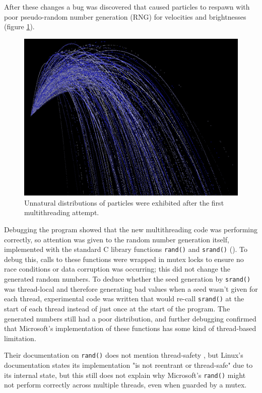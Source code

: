 \documentclass[11pt, a4paper, twocolumn]{article}
\begin{document}
After these changes a bug was discovered that caused particles to respawn with poor pseudo-random number generation (RNG) for velocities and brightnesses (figure \ref{fig:randombug}).

\begin{figure}[h]
\includegraphics[width=\linewidth]{randombug}
\caption{Unnatural distributions of particles were exhibited after the first multithreading attempt.}
\label{fig:randombug}
\end{figure}

Debugging the program showed that the new multithreading code was performing correctly, so attention was given to the random number generation itself, implemented with the standard C library functions \verb|rand()| and \verb|srand()| (\citeyear{CLibRand}). To debug this, calls to these functions were wrapped in mutex locks to ensure no race conditions or data corruption was occurring; this did not change the generated random numbers. To deduce whether the seed generation by \verb|srand()| was thread-local and therefore generating bad values when a seed wasn't given for each thread, experimental code was written that would re-call \verb|srand()| at the start of each thread instead of just once at the start of the program. The generated numbers still had a poor distribution, and further debugging confirmed that Microsoft's implementation of these functions has some kind of thread-based limitation.

Their documentation on \verb|rand()| does not mention thread-safety \citep{CLibRandMicrosoft}, but Linux's documentation states its implementation "is not reentrant or thread-safe" \citep{CLibRandLinux} due to its internal state, but this still does not explain why Microsoft's \verb|rand()| might not perform correctly across multiple threads, even when guarded by a mutex.
\end{document}
